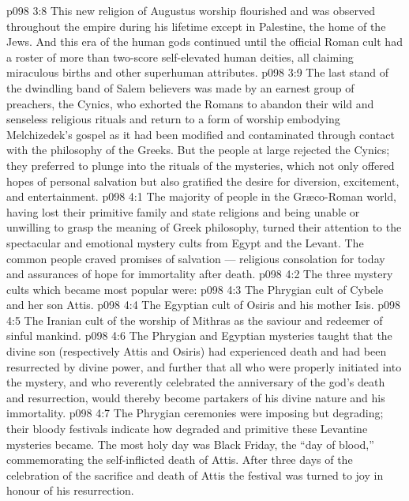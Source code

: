 \vs p098 3:8 This new religion of Augustus worship flourished and was observed throughout the empire during his lifetime except in Palestine, the home of the Jews. And this era of the human gods continued until the official Roman cult had a roster of more than two\hyp{}score self\hyp{}elevated human deities, all claiming miraculous births and other superhuman attributes.
\vs p098 3:9 \pc The last stand of the dwindling band of Salem believers was made by an earnest group of preachers, the Cynics, who exhorted the Romans to abandon their wild and senseless religious rituals and return to a form of worship embodying Melchizedek’s gospel as it had been modified and contaminated through contact with the philosophy of the Greeks. But the people at large rejected the Cynics; they preferred to plunge into the rituals of the mysteries, which not only offered hopes of personal salvation but also gratified the desire for diversion, excitement, and entertainment.
\vs p098 4:1 The majority of people in the Gr\ae co\hyp{}Roman world, having lost their primitive family and state religions and being unable or unwilling to grasp the meaning of Greek philosophy, turned their attention to the spectacular and emotional mystery cults from Egypt and the Levant. The common people craved promises of salvation --- religious consolation for today and assurances of hope for immortality after death.
\vs p098 4:2 The three mystery cults which became most popular were:
\vs p098 4:3 \bibnobreakspace The Phrygian cult of Cybele and her son Attis.
\vs p098 4:4 \bibnobreakspace The Egyptian cult of Osiris and his mother Isis.
\vs p098 4:5 \bibnobreakspace The Iranian cult of the worship of Mithras as the saviour and redeemer of sinful mankind.
\vs p098 4:6 \pc The Phrygian and Egyptian mysteries taught that the divine son (respectively Attis and Osiris) had experienced death and had been resurrected by divine power, and further that all who were properly initiated into the mystery, and who reverently celebrated the anniversary of the god’s death and resurrection, would thereby become partakers of his divine nature and his immortality.
\vs p098 4:7 \pc The Phrygian ceremonies were imposing but degrading; their bloody festivals indicate how degraded and primitive these Levantine mysteries became. The most holy day was Black Friday, the “day of blood,” commemorating the self\hyp{}inflicted death of Attis. After three days of the celebration of the sacrifice and death of Attis the festival was turned to joy in honour of his resurrection.

